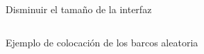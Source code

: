 \begin{frame}
    \begin{columns}
        \column{\dimexpr\paperwidth-10pt}
        \begin{figure}
            \caption{Disminuir el tamaño de la interfaz}
          \end{figure}
      \end{columns}
\end{frame}

\begin{frame}
    \begin{columns}
        \column{\dimexpr\paperwidth-10pt}
        \begin{figure}
            \caption{Ejemplo de colocación de los barcos aleatoria}
          \end{figure}
      \end{columns} 
\end{frame}

